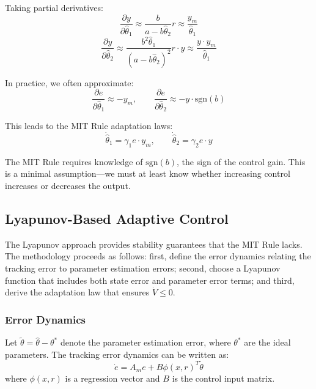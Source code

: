 Taking partial derivatives:
\begin{equation}
\frac{\partial y}{\partial \hat{\theta}_1} \approx \frac{b}{a - b\hat{\theta}_2}r \approx \frac{y_m}{\hat{\theta}_1}
\label{eq:sensitivity1}
\end{equation}
\begin{equation}
\frac{\partial y}{\partial \hat{\theta}_2} \approx \frac{b^2\hat{\theta}_1}{(a - b\hat{\theta}_2)^2}r \cdot y \approx \frac{y \cdot y_m}{\hat{\theta}_1}
\label{eq:sensitivity2}
\end{equation}

In practice, we often approximate:
\begin{equation}
\frac{\partial e}{\partial \hat{\theta}_1} \approx -y_m, \qquad \frac{\partial e}{\partial \hat{\theta}_2} \approx -y \cdot \text{sgn}(b)
\label{eq:practical_sensitivity}
\end{equation}

This leads to the MIT Rule adaptation laws:
\begin{equation}
\boxed{
\dot{\hat{\theta}}_1 = \gamma_1 e \cdot y_m, \qquad \dot{\hat{\theta}}_2 = \gamma_2 e \cdot y
}
\label{eq:mit_adaptation_laws}
\end{equation}

\begin{remark}
The MIT Rule requires knowledge of $\text{sgn}(b)$, the sign of the control gain. This is a minimal assumption---we must at least know whether increasing control increases or decreases the output.
\end{remark}

\subsection{Lyapunov-Based Adaptive Control}

The Lyapunov approach provides stability guarantees that the MIT Rule lacks. The methodology proceeds as follows: first, define the error dynamics relating the tracking error to parameter estimation errors; second, choose a Lyapunov function that includes both state error and parameter error terms; and third, derive the adaptation law that ensures $\dot{V} \leq 0$.

\subsubsection{Error Dynamics}

Let $\tilde{\theta} = \hat{\theta} - \theta^*$ denote the parameter estimation error, where $\theta^*$ are the ideal parameters. The tracking error dynamics can be written as:
\begin{equation}
\dot{e} = A_m e + B \phi(x,r)^T \tilde{\theta}
\label{eq:error_dynamics}
\end{equation}
where $\phi(x,r)$ is a regression vector and $B$ is the control input matrix.

